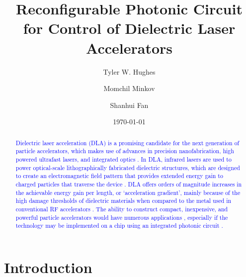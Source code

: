 \documentclass[%
 reprint,
 amsmath,amssymb,
 aps,
prstab,
floatfix,
]{revtex4-1}
\begin{document}

\title{Reconfigurable Photonic Circuit for Control of Dielectric Laser Accelerators}

\author{Tyler W. Hughes}
\author{Momchil Minkov}%
\author{Shanhui Fan}%

\noaffiliation

\date{\today}

\begin{abstract}
\textcolor{blue}{Dielectric laser acceleration (DLA) is a promising candidate for the next generation of particle accelerators, which makes use of advances in precision nanofabrication, high powered ultrafast lasers, and integrated optics \cite{peralta_demonstration_2013,breuer_laser-based_2013,breuer_dielectric_2014,leedle_dielectric_2015,leedle_laser_2015,wootton_demonstration_2016}.  In DLA, infrared lasers are used to power optical-scale lithographically fabricated dielectric structures, which are designed to create an electromagnetic field pattern that provides extended energy gain to charged particles that traverse the device \cite{plettner_proposed_2006,hughes_method_2017}.  DLA offers orders of magnitude increases in the achievable energy gain per length, or `acceleration gradient', mainly because of the high damage thresholds of dielectric materials when compared to the metal used in conventional RF accelerators \cite{soong_laser_2013}.  The ability to construct compact, inexpensive, and powerful particle accelerators would have numerous applications \cite{england_dielectric_2014,wootton_dielectric_2016}, especially if the technology may be implemented on a chip using an integrated photonic circuit \cite{hughes_-chip_2017}.}
 
\end{abstract}

\maketitle

\section{\label{sec:intro}Introduction}
\end{document}

